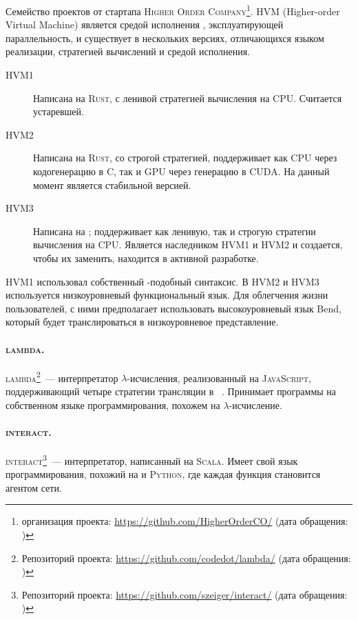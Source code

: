 Семейство проектов от стартапа \textsc{Higher Order Company}\footnote{\GitHub{} организация проекта: \url{https://github.com/HigherOrderCO/} (дата обращения: )}.
HVM (Higher-order Virtual Machine) является средой исполнения \INs{}, эксплуатирующей параллельность, и существует в нескольких версиях, отличающихся языком реализации, стратегией вычислений и средой исполнения.
\begin{description}
      \item[HVM1] Написана на \textsc{Rust}, с ленивой стратегией вычисления на CPU.
            Считается устаревшей.
      \item[HVM2] Написана на \textsc{Rust}, со строгой стратегией, поддерживает как CPU через кодогенерацию в C, так и GPU через генерацию в CUDA.
            На данный момент является стабильной версией.
      \item[HVM3] Написана на \Haskell{}; поддерживает как ленивую, так и строгую стратегии вычисления на CPU.
            Является наследником HVM1 и HVM2 и создается, чтобы их заменить, находится в активной разработке.
\end{description}
HVM1 использовал собственный \Haskell{}-подобный синтаксис.
В HVM2 и HVM3 используется низкоуровневый функциональный язык.
Для облегчения жизни пользователей, с ними предполагает использовать высокоуровневый язык Bend, который будет транслироваться в низкоуровневое представление.

\paragraph{\textsc{lambda}.}

\textsc{lambda}\footnote{Репозиторий проекта: \url{https://github.com/codedot/lambda/} (дата обращения: )}~--- интерпретатор $\lambda$-исчисления, реализованный на \textsc{JavaScript}, поддерживающий четыре стратегии трансляции в \INs{}~\cite{salikhmetovTokenpassingOptimalReduction2016a}.
Принимает программы на собственном языке программирования, похожем на $\lambda$-исчисление.

\paragraph{\textsc{interact}.}

\textsc{interact}\footnote{Репозиторий проекта: \url{https://github.com/szeiger/interact/} (дата обращения: )}~--- интерпретатор, написанный на \textsc{Scala}.
Имеет свой язык программирования, похожий на \OCaml{} и \textsc{Python}, где каждая функция становится агентом сети.

